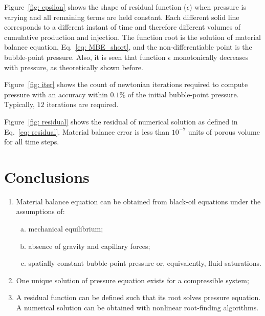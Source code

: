 \documentclass[authoryear,preprint,review,11pt]{elsarticle}
\begin{document}
Figure~\ref{fig: epsilon} shows the shape of residual function ($\epsilon$) when pressure is varying and all remaining terms are held constant. Each different solid line corresponds to a different instant of time and therefore different volumes of cumulative production and injection. The function root is the solution of material balance equation, Eq.~\eqref{eq: MBE_short}, and the non-differentiable point is the bubble-point pressure. Also, it is seen that function $\epsilon$ monotonically decreases with pressure, as theoretically shown before.

Figure~\ref{fig: iter} shows the count of newtonian iterations required to compute pressure with an accuracy within $0.1\%$ of the initial bubble-point pressure. Typically, $12$ iterations are required.

Figure~\ref{fig: residual} shows the residual of numerical solution as defined in Eq.~\eqref{eq: residual}. Material balance error is less than $10^{-7}$ units of porous volume for all time steps.



\section{Conclusions}
\begin{enumerate}[1.]
\item Material balance equation can be obtained from black-oil equations under the assumptions of:
\begin{enumerate}[(a)]
\item mechanical equilibrium;
\item absence of gravity and capillary forces;
\item spatially constant bubble-point pressure or, equivalently, fluid saturations.
\end{enumerate}
\item One unique solution of pressure equation exists for a compressible system;
\item A residual function can be defined such that its root solves pressure equation. A numerical solution can be obtained with nonlinear root-finding algorithms.
\end{enumerate}
\end{document}
